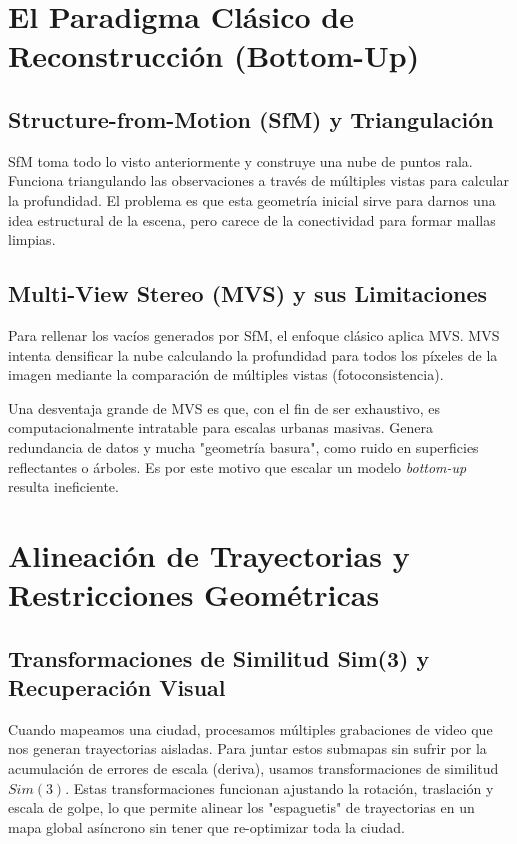 \section{El Paradigma Clásico de Reconstrucción (Bottom-Up)}

\subsection{Structure-from-Motion (SfM) y Triangulación}
SfM toma todo lo visto anteriormente y construye una nube de puntos rala. Funciona triangulando las observaciones a través de múltiples vistas para calcular la profundidad. El problema es que esta geometría inicial sirve para darnos una idea estructural de la escena, pero carece de la conectividad para formar mallas limpias.


\subsection{Multi-View Stereo (MVS) y sus Limitaciones}
Para rellenar los vacíos generados por SfM, el enfoque clásico aplica MVS. MVS intenta densificar la nube calculando la profundidad para todos los píxeles de la imagen mediante la comparación de múltiples vistas (fotoconsistencia).

Una desventaja grande de MVS es que, con el fin de ser exhaustivo, es computacionalmente intratable para escalas urbanas masivas. Genera redundancia de datos y mucha "geometría basura", como ruido en superficies reflectantes o árboles. Es por este motivo que escalar un modelo \textit{bottom-up} resulta ineficiente.


\section{Alineación de Trayectorias y Restricciones Geométricas}

\subsection{Transformaciones de Similitud Sim(3) y Recuperación Visual}
Cuando mapeamos una ciudad, procesamos múltiples grabaciones de video que nos generan trayectorias aisladas. Para juntar estos submapas sin sufrir por la acumulación de errores de escala (deriva), usamos transformaciones de similitud $Sim(3)$. Estas transformaciones funcionan ajustando la rotación, traslación y escala de golpe, lo que permite alinear los "espaguetis" de trayectorias en un mapa global asíncrono sin tener que re-optimizar toda la ciudad.


